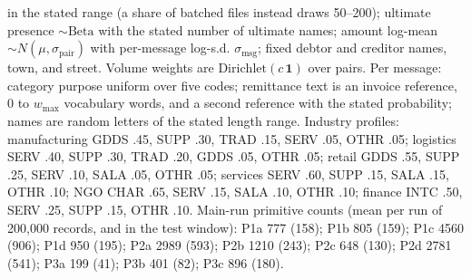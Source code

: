 \documentclass[conference]{IEEEtran}
\begin{document}
in the stated range (a share of batched files instead draws 50--200); ultimate
presence $\sim\mathrm{Beta}$ with the stated number of ultimate names; amount
log-mean $\sim N(\mu,\sigma_{\mathrm{pair}})$ with per-message log-s.d.
$\sigma_{\mathrm{msg}}$; fixed debtor and creditor names, town, and street.
Volume weights are $\mathrm{Dirichlet}(c\,\mathbf{1})$ over pairs. Per message:
category purpose uniform over five codes; remittance text is an invoice
reference, 0 to $w_{\max}$ vocabulary words, and a second reference with the
stated probability; names are random letters of the stated length range.
Industry profiles: manufacturing GDDS .45, SUPP .30, TRAD .15, SERV .05, OTHR
.05; logistics SERV .40, SUPP .30, TRAD .20, GDDS .05, OTHR .05; retail GDDS
.55, SUPP .25, SERV .10, SALA .05, OTHR .05; services SERV .60, SUPP .15, SALA
.15, OTHR .10; NGO CHAR .65, SERV .15, SALA .10, OTHR .10; finance INTC .50,
SERV .25, SUPP .15, OTHR .10. Main-run primitive counts (mean per run of
200{,}000 records, and in the test window): P1a 777 (158); P1b 805 (159); P1c 4560 (906); P1d 950 (195); P2a 2989 (593); P2b 1210 (243); P2c 648 (130); P2d 2781 (541); P3a 199 (41); P3b 401 (82); P3c 896 (180).
\end{document}
